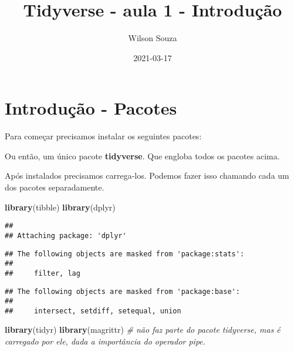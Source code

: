 \documentclass[]{book}
\title{Tidyverse - aula 1 - Introdução}
\author{Wilson Souza}
\date{2021-03-17}
\newenvironment{Shaded}{\begin{snugshade}}{\end{snugshade}}
\newcommand{\CommentTok}[1]{\textcolor[rgb]{0.56,0.35,0.01}{\textit{#1}}}
\newcommand{\KeywordTok}[1]{\textcolor[rgb]{0.13,0.29,0.53}{\textbf{#1}}}
\newcommand{\NormalTok}[1]{#1}
\begin{document}
\maketitle

{
\setcounter{tocdepth}{1}
\tableofcontents
}
\hypertarget{section}{%
\chapter{}\label{section}}

\hypertarget{introduuxe7uxe3o---pacotes}{%
\chapter{Introdução - Pacotes}\label{introduuxe7uxe3o---pacotes}}

Para começar precisamos instalar os seguintes pacotes:

Ou então, um único pacote \textbf{tidyverse}. Que engloba todos os pacotes acima.

Após instalados precisamos carrega-los. Podemos fazer isso chamando cada um dos pacotes separadamente.

\begin{Shaded}
\begin{Highlighting}[]
\KeywordTok{library}\NormalTok{(tibble)}
\KeywordTok{library}\NormalTok{(dplyr)}
\end{Highlighting}
\end{Shaded}

\begin{verbatim}
## 
## Attaching package: 'dplyr'
\end{verbatim}

\begin{verbatim}
## The following objects are masked from 'package:stats':
## 
##     filter, lag
\end{verbatim}

\begin{verbatim}
## The following objects are masked from 'package:base':
## 
##     intersect, setdiff, setequal, union
\end{verbatim}

\begin{Shaded}
\begin{Highlighting}[]
\KeywordTok{library}\NormalTok{(tidyr)}
\KeywordTok{library}\NormalTok{(magrittr) }\CommentTok{# não faz parte do pacote tidyverse, mas é carregado por ele, dada a importância do operador pipe.}
\end{Highlighting}
\end{Shaded}
\end{document}
